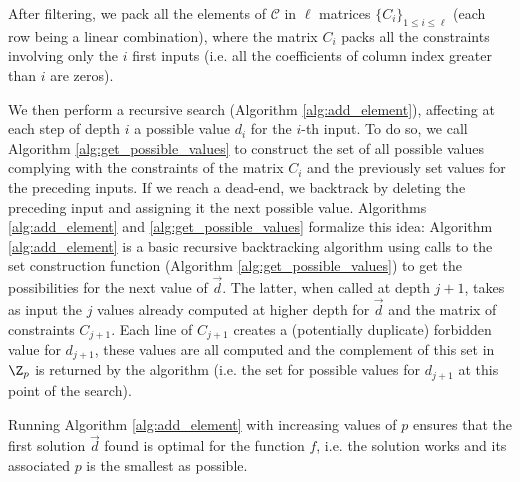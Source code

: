 After filtering, we pack all the elements of $\mathcal{C}$ in $\ell$ matrices $\{C_i\}_{1 \le i \le \ell}$ (each row being a linear combination), where the matrix $C_i$ packs all the constraints involving only the $i$ first inputs (i.e. all the coefficients of column index greater than $i$ are zeros).


We then perform a recursive search (Algorithm \ref{alg:add_element}), affecting at each step of depth $i$ a possible value $d_i$ for the $i$-th input. To do so, we call Algorithm \ref{alg:get_possible_values} to construct the set of all possible values complying with the constraints of the matrix $C_i$ and the previously set values for the preceding inputs. If we reach a dead-end, we backtrack by deleting the preceding input and assigning it the next possible value. Algorithms \ref{alg:add_element} and \ref{alg:get_possible_values} formalize this idea: Algorithm \ref{alg:add_element} is a  basic recursive backtracking algorithm using calls to the set construction function (Algorithm \ref{alg:get_possible_values}) to get the possibilities for the next value of $\vec{d}$. The latter, when called at depth $j+1$, takes as input the 
$j$ values already computed at higher depth for $\vec{d}$ and the matrix of constraints $C_{j+1}$. Each line of $C_{j+1}$ creates a (potentially duplicate) forbidden value for $d_{j+1}$, these values are all computed and the complement of this set in $\Z_p$ is returned by the algorithm (i.e. the set for possible values for $d_{j+1}$ at this point of the search).

\begin{theorem}
     Running Algorithm \ref{alg:add_element} with increasing values of $p$ ensures that the first solution $\vec d$ found is optimal for the function $f$, i.e. the solution works and its associated $p$ is the smallest as possible.   
\end{theorem}



